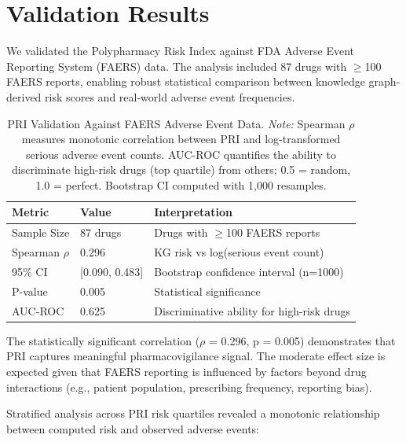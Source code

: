 \documentclass[11pt,a4paper]{article}
\begin{document}
\section{Validation Results}

We validated the Polypharmacy Risk Index against FDA Adverse Event Reporting System (FAERS) data. The analysis included 87 drugs with $\geq$100 FAERS reports, enabling robust statistical comparison between knowledge graph-derived risk scores and real-world adverse event frequencies.

\begin{table}[H]
\centering
\caption[PRI Validation Against FAERS Adverse Event Data]{PRI Validation Against FAERS Adverse Event Data. \textit{Note:} Spearman $\rho$ measures monotonic correlation between PRI and log-transformed serious adverse event counts. AUC-ROC quantifies the ability to discriminate high-risk drugs (top quartile) from others; 0.5 = random, 1.0 = perfect. Bootstrap CI computed with 1,000 resamples.}
\label{tab:validation_summary}
\begin{tabular}{lll}
\toprule
\textbf{Metric} & \textbf{Value} & \textbf{Interpretation} \\
\midrule
Sample Size & 87 drugs & Drugs with $\geq$100 FAERS reports \\
Spearman $\rho$ & 0.296 & KG risk vs log(serious event count) \\
95\% CI & [0.090, 0.483] & Bootstrap confidence interval (n=1000) \\
P-value & 0.005 & Statistical significance \\
AUC-ROC & 0.625 & Discriminative ability for high-risk drugs \\
\bottomrule
\end{tabular}
\end{table}

The statistically significant correlation ($\rho$ = 0.296, p = 0.005) demonstrates that PRI captures meaningful pharmacovigilance signal. The moderate effect size is expected given that FAERS reporting is influenced by factors beyond drug interactions (e.g., patient population, prescribing frequency, reporting bias).

Stratified analysis across PRI risk quartiles revealed a monotonic relationship between computed risk and observed adverse events:
\end{document}
